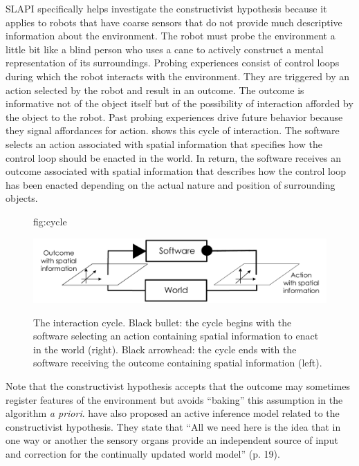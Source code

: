 \documentclass[pmlr]{jmlr}%
\begin{document}
SLAPI specifically helps investigate the constructivist hypothesis because it applies to robots that have coarse sensors that do not provide much descriptive information about the environment. 
The robot must probe the environment a little bit like a blind person who uses a cane to actively construct a mental representation of its surroundings. 
Probing experiences consist of control loops during which the robot interacts with the environment.   
They are triggered by an action selected by the robot and result in an outcome. 
The outcome is informative not of the object itself but of the possibility of interaction afforded by the object to the robot. 
Past probing experiences drive future behavior because they signal affordances for action. 
 shows this cycle of interaction. 
The software selects an action associated with spatial information that specifies how the control loop should be enacted in the world. 
In return, the software receives an outcome associated with spatial information that describes how the control loop has been enacted depending on the actual nature and position of surrounding objects. 


\begin{figure}[htbp]
	\floatconts
	{fig:cycle}
	{\caption{The interaction cycle. Black bullet: the cycle begins with the software selecting an action containing spatial information to enact in the world (right). Black arrowhead: the cycle ends with the software receiving the outcome containing spatial information (left).}}
	{\includegraphics[width=0.8\linewidth]{images/Figure_0_Cycle}}
\end{figure}

Note that the constructivist hypothesis accepts that the outcome may sometimes register features of the environment but avoids ``baking'' this assumption in the algorithm \textit{a priori}. 
\cite{rudrauf_mathematical_2017} have also proposed an active inference model related to the constructivist hypothesis. They state that ``All we need here is the idea that in one way or another the sensory organs provide an independent source of input and correction for the continually updated world model'' (p. 19).
\end{document}
